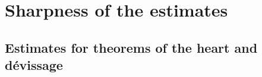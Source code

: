 \documentclass[11pt,leqno]{amsart}
\newtheorem{theo}{Theorem}[section]
\numberwithin{equation}{section}
\newcommand{\xto}{\xrightarrow}
\newcommand{\Cat}{\operatorname{Cat}}
\newcommand{\Cone}{\operatorname{Cone}}
\newcommand{\st}{\operatorname{st}}
\newcommand{\dual}{\operatorname{dual}}
\newcommand{\cA}{{\mathcal A}}
\newcommand{\cB}{{\mathcal B}}
\newcommand{\cE}{{\mathcal E}}
\newcommand{\cT}{{\mathcal T}}
\newcommand{\la}{\langle}
\newcommand{\ra}{\rangle}
\begin{document}

\section{Sharpness of the estimates}
\label{sec:sharpness_of_estimates}

\subsection{Estimates for theorems of the heart and d\'evissage}
\end{document}
